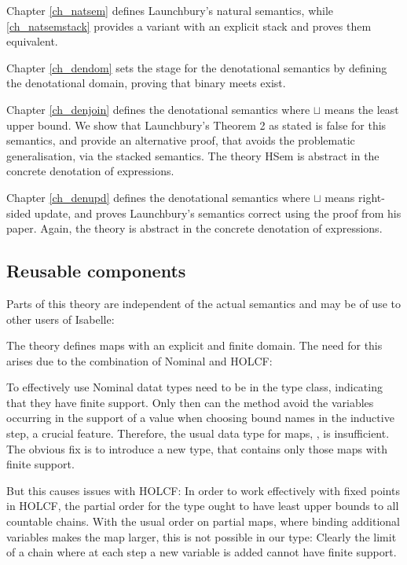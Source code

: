 \documentclass[11pt,a4paper,parskip=half]{scrartcl}
\begin{document}
Chapter \ref{ch_natsem} defines Launchbury's natural semantics, while \ref{ch_natsemstack} provides a variant with an explicit stack and proves them equivalent.

Chapter \ref{ch_dendom} sets the stage for the denotational semantics by defining the denotational domain, proving that binary meets exist.

Chapter \ref{ch_denjoin} defines the denotational semantics where $\sqcup$ means the least upper bound. We show that Launchbury's Theorem 2 as stated is false for this semantics, and provide an alternative proof, that avoids the problematic generalisation, via the stacked semantics. The theory HSem is abstract in the concrete denotation of expressions.

Chapter \ref{ch_denupd} defines the denotational semantics where $\sqcup$ means right-sided update, and proves Launchbury's semantics correct using the proof from his paper. Again, the theory  is abstract in the concrete denotation of expressions.

\subsection{Reusable components}

Parts of this theory are independent of the actual semantics and may be of use to other users of Isabelle:

The theory  defines maps with an explicit and finite domain. The need for this arises due to the combination of Nominal and HOLCF:

To effectively use Nominal datat types need to be in the  type class, indicating that they have finite support. Only then can the  method avoid the variables occurring in the support of a value when choosing bound names in the inductive step, a crucial feature. Therefore, the usual data type for maps, , is insufficient. The obvious fix is to introduce a new type,  that contains only those maps with finite support.

But this causes issues with HOLCF: In order to work effectively with fixed points in HOLCF, the partial order for the type ought to have least upper bounds to all countable chains. With the usual order on partial maps, where binding additional variables makes the map larger, this is not possible in our type: Clearly the limit of a chain where at each step a new variable is added cannot have finite support.
\end{document}
